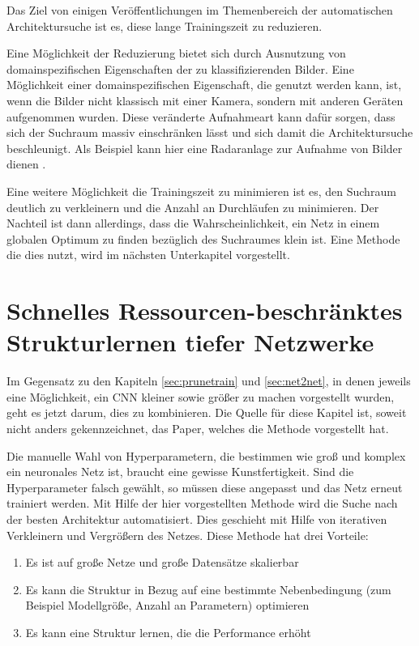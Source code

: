 Das Ziel von einigen Veröffentlichungen im Themenbereich der automatischen Architektursuche ist es, diese lange Trainingszeit zu reduzieren.

Eine Möglichkeit der Reduzierung bietet sich durch Ausnutzung von domainspezifischen Eigenschaften der zu klassifizierenden Bilder. Eine Möglichkeit einer domainspezifischen Eigenschaft, die genutzt werden kann, ist, wenn die Bilder nicht klassisch mit einer Kamera, sondern mit anderen Geräten aufgenommen wurden. Diese veränderte Aufnahmeart kann dafür sorgen, dass sich der Suchraum massiv einschränken lässt und sich damit die Architektursuche beschleunigt.
Als Beispiel kann hier eine Radaranlage zur Aufnahme von Bilder dienen \cite{polsar}.


Eine weitere Möglichkeit die Trainingszeit zu minimieren ist es, den Suchraum deutlich zu verkleinern und die Anzahl an Durchläufen zu minimieren. Der Nachteil ist dann allerdings, dass die Wahrscheinlichkeit, ein Netz in einem globalen Optimum zu finden bezüglich des Suchraumes klein ist. Eine Methode die dies nutzt, wird im nächsten Unterkapitel vorgestellt.
\color{black}


\section{Schnelles Ressourcen-beschränktes Strukturlernen tiefer Netzwerke}\label{sec:morphnet}
Im Gegensatz zu den Kapiteln \ref{sec:prunetrain} und \ref{sec:net2net}, in denen jeweils eine Möglichkeit, ein CNN kleiner sowie größer zu machen vorgestellt wurden, geht es jetzt darum, dies zu kombinieren. Die Quelle für diese Kapitel ist, soweit nicht anders gekennzeichnet, das Paper, welches die Methode vorgestellt hat.

Die manuelle Wahl von Hyperparametern, die bestimmen wie groß und komplex ein neuronales Netz ist, braucht eine gewisse Kunstfertigkeit. Sind die Hyperparameter falsch gewählt, so müssen diese angepasst und das Netz erneut trainiert werden. Mit Hilfe der hier vorgestellten Methode wird die Suche nach der besten Architektur automatisiert. Dies geschieht mit Hilfe von iterativen Verkleinern und Vergrößern des Netzes. Diese Methode hat drei Vorteile:
\begin{enumerate}
 \item Es ist auf große Netze und große Datensätze skalierbar
 \item Es kann die Struktur in Bezug auf eine bestimmte Nebenbedingung (zum Beispiel Modellgröße, Anzahl an Parametern) optimieren
 \item Es kann eine Struktur lernen, die die Performance erhöht
\end{enumerate}

